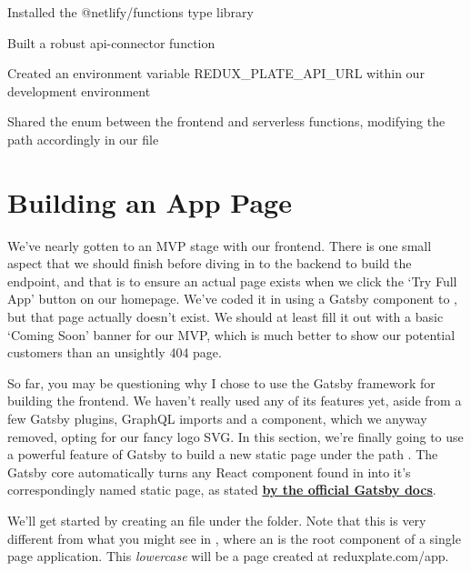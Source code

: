 \documentclass[a4paper,headinclude=on,footinclude=on,12pt,oneside]{scrbook}
\newcommand{\link}[2]{\textbf{\textcolor{monokaiPink}{\href{#2}{#1}}}}
\begin{document}
\begin{arrows}
\item Installed the @netlify/functions type library 
\item Built a robust api-connector function
\item Created an environment variable REDUX\_PLATE\_API\_URL within our development environment
\item Shared the  enum between the frontend and serverless functions, modifying the  path accordingly in our  file
\end{arrows}

\section{Building an App Page}

We've nearly gotten to an MVP stage with our frontend. There is one small aspect that we should finish before diving in to the backend to build the  endpoint, and that is to ensure an actual page exists when we click the `Try Full App' button on our homepage. We've coded it in using a Gatsby  component to , but that page actually doesn't exist. We should at least fill it out with a basic `Coming Soon' banner for our MVP, which is much better to show our potential customers than an unsightly 404 page.


So far, you may be questioning why I chose to use the Gatsby framework for building the frontend. We haven't really used any of its features yet, aside from a few Gatsby plugins, GraphQL imports and a  component, which we anyway removed, opting for our fancy logo SVG. In this section, we're finally going to use a powerful feature of Gatsby to build a new static page under the path . The Gatsby core automatically turns any React component found in  into it's correspondingly named static page, as stated \link{by the official Gatsby docs}{https://www.gatsbyjs.com/docs/recipes/pages-layouts/}.


We'll get started by creating an  file under the  folder. Note that this is very different from what you might see in , where an  is the root component of a single page application. This \textit{lowercase}  will be a page created at reduxplate.com/app.
\end{document}
